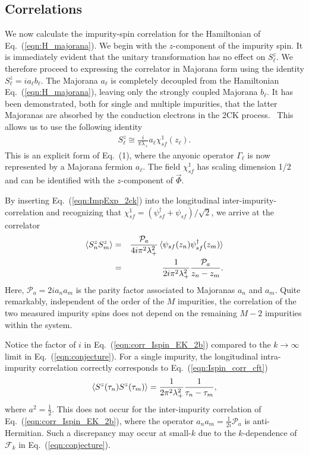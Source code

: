 \documentclass[aps,prb,twocolumn,superscriptaddress]{revtex4-1}
\begin{document}
\subsection{Correlations} \label{sec:4_corr}
We now calculate the impurity-spin correlation for the Hamiltonian of Eq.~(\ref{eqn:H_majorana}). We begin with the $z$-component of the impurity spin. It is immediately evident that the unitary transformation has no effect on $S_{\ell}^{z}$. We therefore proceed to expressing the correlator in Majorana form using the identity $S_{\ell}^{z}=ia_{\ell}b_{\ell}$. 
The Majorana $a_{\ell}$ is completely decoupled from the  Hamiltonian  Eq.~(\ref{eqn:H_majorana}), leaving only the strongly coupled Majorana $b_{\ell}$. It has been demonstrated, both for single and multiple impurities, that the latter Majoranas are absorbed by the conduction electrons in the 2CK process.~\cite{sela2009nonequilibrium1,sela2009nonequilibrium2,landau2018charge,lopes2020anyons} This allows us to use the following identity 
\begin{eqnarray}
S^{z}_{\ell} \cong \frac{i}{\pi\lambda_{+}} a_\ell \chi^1_{sf}(z_\ell). \label{eqn:ImpExp_2ck}
\end{eqnarray}
This is an explicit form of Eq.~(1), where the anyonic operator $\Gamma_\ell$ is now represented by a Majorana fermion $a_\ell$. The field $\chi_{sf}^1$ has scaling dimension 1/2 and can be identified with the $z$-component of $\vec{\Phi}$.

By inserting Eq.~(\ref{eqn:ImpExp_2ck}) into the longitudinal inter-impurity-correlation and recognizing that $\chi_{sf}^{1}=(\psi_{sf}^{\dagger}+\psi_{sf})/\sqrt{2}$, we arrive at the correlator
\begin{eqnarray}
\braket{S^{z}_{n}S^{z}_{m}}&=&\frac{\mathcal{P}_{a}}{4i\pi^{2}\lambda_{+}^{2}}\braket{\psi_{sf}(z_{n})\psi_{sf}^{\dagger}(z_{m})} \label{eqn:corr_Ispin_EK_2a} \\
&=&\frac{1}{2i\pi^{2}\lambda_{+}^{2}}\frac{\mathcal{P}_{a}}{z_{n}-z_{m}}. \label{eqn:corr_Ispin_EK_2b}
\end{eqnarray}
Here, $\mathcal{P}_{a}=2ia_{n}a_{m}$ is the parity factor associated to Majoranas $a_{n}$ and $a_{m}$. 
Quite remarkably, independent of the order of the $M$ impurities, the correlation of the two measured impurity spins does not depend on the remaining $M-2$ impurities within the system. 

Notice the factor of $i$ in Eq.~(\ref{eqn:corr_Ispin_EK_2b}) compared to the $k \to \infty$ limit in Eq.~(\ref{eqn:conjecture}). For a single impurity, the longitudinal intra-impurity correlation correctly corresponds to Eq.~(\ref{eqn:Ispin_corr_cft})
\begin{eqnarray}
\braket{S^{z}(\tau_{n})S^{z}(\tau_{m})}=\frac{1}{2\pi^{2}\lambda_{+}^{2}}\frac{1}{\tau_{n}-\tau_{m}}, \label{eqn:corr_Ispin_EK_3} 
\end{eqnarray}
where $a^{2}=\frac{1}{2}$. This does not occur for the inter-impurity correlation of Eq.~(\ref{eqn:corr_Ispin_EK_2b}), where the operator $a_{n}a_{m}=\frac{1}{2i}\mathcal{P}_{a}$ is anti-Hermitian. Such a discrepancy may occur at small-$k$ due to the $k$-dependence of $\mathcal{F}_{k}$ in Eq.~(\ref{eqn:conjecture}). 
\end{document}
